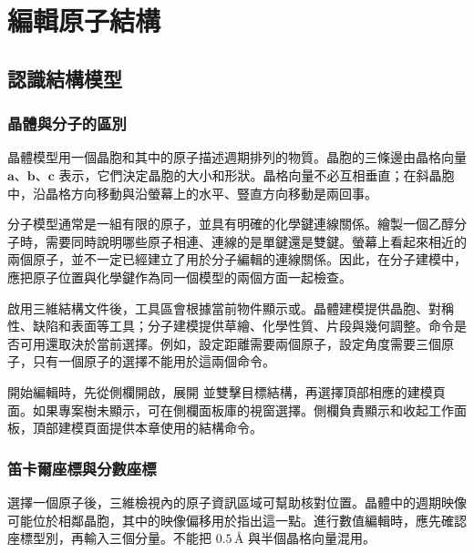 \chapter{編輯原子結構}\label{ch:modeling}


\section{認識結構模型}

\subsection{晶體與分子的區別}

晶體模型用一個晶胞和其中的原子描述週期排列的物質。晶胞的三條邊由晶格向量 $\mathbf a$、$\mathbf b$、$\mathbf c$ 表示，它們決定晶胞的大小和形狀。晶格向量不必互相垂直；在斜晶胞中，沿晶格方向移動與沿螢幕上的水平、豎直方向移動是兩回事。

分子模型通常是一組有限的原子，並具有明確的化學鍵連線關係。繪製一個乙醇分子時，需要同時說明哪些原子相連、連線的是單鍵還是雙鍵。螢幕上看起來相近的兩個原子，並不一定已經建立了用於分子編輯的連線關係。因此，在分子建模中，應把原子位置與化學鍵作為同一個模型的兩個方面一起檢查。

啟用三維結構文件後，工具區會根據當前物件顯示或。晶體建模提供晶胞、對稱性、缺陷和表面等工具；分子建模提供草繪、化學性質、片段與幾何調整。命令是否可用還取決於當前選擇。例如，設定距離需要兩個原子，設定角度需要三個原子，只有一個原子的選擇不能用於這兩個命令。

開始編輯時，先從側欄開啟，展開  並雙擊目標結構，再選擇頂部相應的建模頁面。如果專案樹未顯示，可在側欄面板庫的視窗選擇。側欄負責顯示和收起工作面板，頂部建模頁面提供本章使用的結構命令。

\subsection{笛卡爾座標與分數座標}



選擇一個原子後，三維檢視內的原子資訊區域可幫助核對位置。晶體中的週期映像可能位於相鄰晶胞，其中的映像偏移用於指出這一點。進行數值編輯時，應先確認座標型別，再輸入三個分量。不能把 $0.5\,\text{\AA}$ 與半個晶格向量混用。


